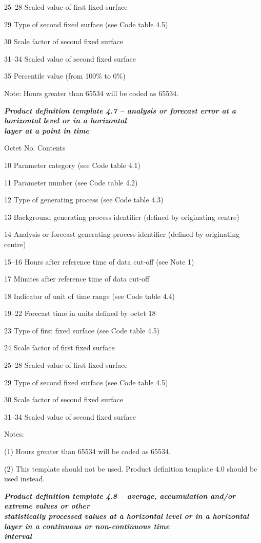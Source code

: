25--28 Scaled value of first fixed surface

29 Type of second fixed surface (see Code table 4.5)

30 Scale factor of second fixed surface

31--34 Scaled value of second fixed surface

35 Percentile value (from 100\% to 0\%)

Note: Hours greater than 65534 will be coded as 65534.

\emph{\textbf{Product definition template 4.7 -- analysis or forecast error at a horizontal level or in a horizontal\\
layer at a point in time}}

Octet No. Contents

10 Parameter category (see Code table 4.1)

11 Parameter number (see Code table 4.2)

12 Type of generating process (see Code table 4.3)

13 Background generating process identifier (defined by originating centre)

14 Analysis or forecast generating process identifier (defined by originating centre)

15--16 Hours after reference time of data cut-off (see Note 1)

17 Minutes after reference time of data cut-off

18 Indicator of unit of time range (see Code table 4.4)

19--22 Forecast time in units defined by octet 18

23 Type of first fixed surface (see Code table 4.5)

24 Scale factor of first fixed surface

25--28 Scaled value of first fixed surface

29 Type of second fixed surface (see Code table 4.5)

30 Scale factor of second fixed surface

31--34 Scaled value of second fixed surface

Notes:

(1) Hours greater than 65534 will be coded as 65534.

(2) This template should not be used. Product definition template 4.0 should be used instead.

\emph{\textbf{Product definition template 4.8 -- average, accumulation and/or extreme values or other\\
statistically processed values at a horizontal level or in a horizontal layer in a continuous or non-continuous time\\
interval}}

